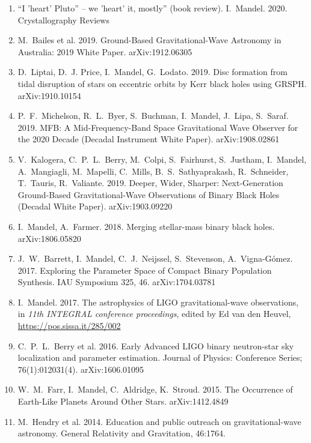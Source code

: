 \documentclass[margin,line]{res}
\begin{document}
\begin{resume}
\begin{enumerate}
\item ``I 'heart' Pluto'' -- we 'heart' it, mostly'' (book review).  I.~Mandel.  2020.  Crystallography Reviews

\item M.~Bailes et al. 2019. Ground-Based Gravitational-Wave Astronomy in Australia: 2019 White Paper. arXiv:1912.06305

\item D.~Liptai, D.~J. Price, I.~Mandel, G.~Lodato.  2019.  Disc formation from tidal disruption of stars on eccentric orbits by Kerr black holes using GRSPH.  arXiv:1910.10154

\item P.~F.~Michelson, R.~L.~Byer, S.~Buchman, I.~Mandel, J.~Lipa, S.~Saraf.  2019. MFB: A Mid-Frequency-Band Space Gravitational Wave Observer for the 2020 Decade (Decadal Instrument White Paper). arXiv:1908.02861 

\item V.~Kalogera, C.~P.~L.~Berry, M.~Colpi, S.~Fairhurst, S.~Justham, I.~Mandel, A.~Mangiagli, M.~Mapelli, C.~Mills, B.~S.~Sathyaprakash, R.~Schneider, T.~Tauris, R.~Valiante. 2019.  Deeper, Wider, Sharper: Next-Generation Ground-Based Gravitational-Wave Observations of Binary Black Holes (Decadal White Paper).  arXiv:1903.09220 

\item I.~Mandel, A.~Farmer.  2018.  Merging stellar-mass binary black holes.  arXiv:1806.05820

\item J.~W.~Barrett, I.~Mandel, C.~J.~Neijssel, S.~Stevenson, A.~Vigna-G\'{o}mez. 2017. Exploring the Parameter Space of Compact Binary Population Synthesis. IAU Symposium 325, 46. arXiv:1704.03781 

\item I.~Mandel.  2017. The astrophysics of LIGO gravitational-wave observations, in {\it 11th INTEGRAL conference proceedings}, edited by Ed van den Heuvel, \url{https://pos.sissa.it/285/002}

\item C.~P.~L.~Berry et al.  2016.  Early Advanced LIGO binary neutron-star sky localization and parameter estimation.  Journal of Physics: Conference Series; 76(1):012031(4).  arXiv:1606.01095

\item W.~M.~Farr, I.~Mandel, C.~Aldridge, K.~Stroud. 2015. The Occurrence of Earth-Like Planets Around Other Stars.  arXiv:1412.4849
  
\item M.~Hendry et al. 2014. Education and public outreach on gravitational-wave astronomy.  General Relativity and Gravitation, 46:1764.


\end{enumerate}
\end{resume}
\end{document}
